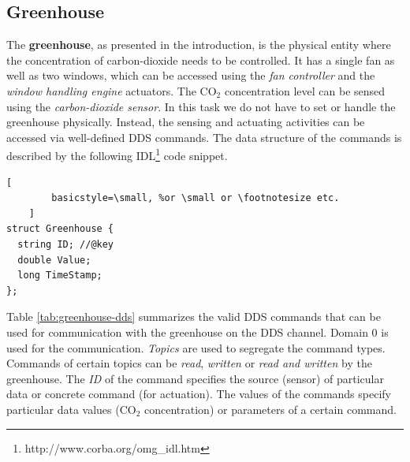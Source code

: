 \documentclass[a4paper, 11pt]{article}
\begin{document}
	\subsection{Greenhouse}
	\label{sec:greenhouse}
	The \textbf{greenhouse}, as presented in the introduction, is the physical entity where the concentration of carbon-dioxide needs to be controlled. It has a single fan as well as two windows, which can be accessed using the \emph{fan controller} and the \emph{window handling engine} actuators. The CO$_2$ concentration level can be sensed using the \emph{carbon-dioxide sensor}. In this task we do not have to set or handle the greenhouse physically. Instead, the sensing and actuating activities can be accessed via well-defined DDS commands. The data structure of the commands is described by the following IDL\footnote{http://www.corba.org/omg\_idl.htm} code snippet.
	\begin{lstlisting}[
		basicstyle=\small, %or \small or \footnotesize etc.
	]
struct Greenhouse {
  string ID; //@key
  double Value;
  long TimeStamp;
};
	\end{lstlisting}
	
	Table \ref{tab:greenhouse-dds} summarizes the valid DDS commands that can be used for communication with the greenhouse on the DDS channel. Domain 0 is used for the communication. \emph{Topics} are used to segregate the command types.  Commands of certain topics can be \emph{read}, \emph{written} or \emph{read and written} by the greenhouse. The \emph{ID} of the command specifies the source (sensor) of particular data or concrete command (for actuation). The values of the commands specify particular data values (CO$_2$ concentration) or parameters of a certain command.
	
\end{document}
